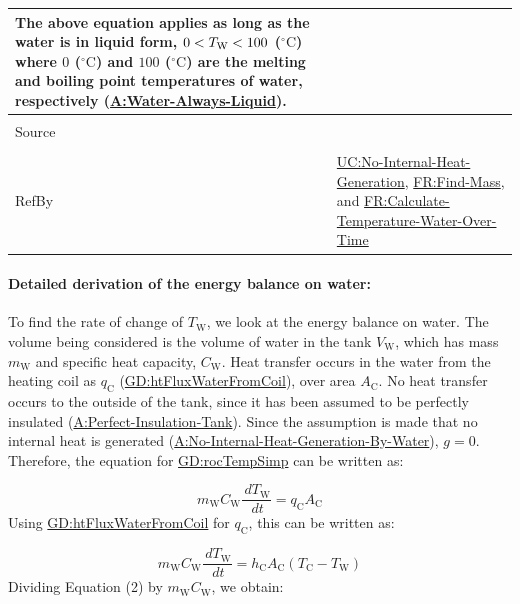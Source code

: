 \documentclass[12pt]{article}
\newcommand{\lt}{\ensuremath <}
\begin{document}
\begin{minipage}{\textwidth}
\begin{tabular}{>{\raggedright}p{}>{\raggedright\arraybackslash}p{}}
        The above equation applies as long as the water is in liquid form, $0\lt{}{T_{\text{W}}}\lt{}100$ (${{}^{\circ}\text{C}}$) where $0$ (${{}^{\circ}\text{C}}$) and $100$ (${{}^{\circ}\text{C}}$) are the melting and boiling point temperatures of water, respectively (\hyperref[assumpWAL]{A:Water-Always-Liquid}).
        
\\ \midrule \\
Source & \cite[(with PCM removed)]{koothoor2013}
         
\\ \midrule \\
RefBy & \hyperref[unlikeChgNIHG]{UC:No-Internal-Heat-Generation}, \hyperref[findMass]{FR:Find-Mass}, and \hyperref[calcTempWtrOverTime]{FR:Calculate-Temperature-Water-Over-Time}
        
\\ \bottomrule
\end{tabular}
\end{minipage}
\paragraph{Detailed derivation of the energy balance on water:}
\label{IM:eBalanceOnWtrDeriv}
To find the rate of change of ${T_{\text{W}}}$, we look at the energy balance on water. The volume being considered is the volume of water in the tank ${V_{\text{W}}}$, which has mass ${m_{\text{W}}}$ and specific heat capacity, ${C_{\text{W}}}$. Heat transfer occurs in the water from the heating coil as ${q_{\text{C}}}$ (\hyperref[GD:htFluxWaterFromCoil]{GD:htFluxWaterFromCoil}), over area ${A_{\text{C}}}$. No heat transfer occurs to the outside of the tank, since it has been assumed to be perfectly insulated (\hyperref[assumpPIT]{A:Perfect-Insulation-Tank}). Since the assumption is made that no internal heat is generated (\hyperref[assumpNIHGBW]{A:No-Internal-Heat-Generation-By-Water}), $g=0$. Therefore, the equation for \hyperref[GD:rocTempSimp]{GD:rocTempSimp} can be written as:

\begin{displaymath}
{m_{\text{W}}} {C_{\text{W}}} \frac{\,d{T_{\text{W}}}}{\,dt}={q_{\text{C}}} {A_{\text{C}}}
\end{displaymath}
Using \hyperref[GD:htFluxWaterFromCoil]{GD:htFluxWaterFromCoil} for ${q_{\text{C}}}$, this can be written as:

\begin{displaymath}
{m_{\text{W}}} {C_{\text{W}}} \frac{\,d{T_{\text{W}}}}{\,dt}={h_{\text{C}}} {A_{\text{C}}} \left({T_{\text{C}}}-{T_{\text{W}}}\right)
\end{displaymath}
Dividing Equation (2) by ${m_{\text{W}}} {C_{\text{W}}}$, we obtain:
\end{document}
